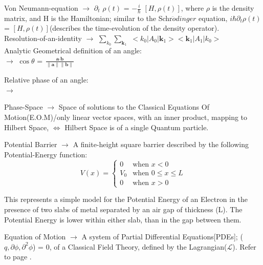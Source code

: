 \documentclass[a4paper, 10pt, onepage]{elegantbook}
\begin{document}
{Von Neumann-equation $\longrightarrow$ $\partial_t$ $\rho(t)$ = $- {\frac{i}{\hbar}}$ $[H,\rho(t)]$, where $\rho$ is the density matrix, and H is the Hamiltonian;
similar to the Schr$\ddot{o}dinger$ equation, $i\hbar \partial_t \rho(t)$ = $[H, \rho(t)]$(describes the time-evolution of the density operator).  \\
  
Resolution-of-an-identity $\longrightarrow$ $\sum_{k_0} \sum_{\mathbf k_1}$ $<k_0|A_0| {\mathbf k_1}><{\mathbf k_1}|A_1|k_0>$ \\

Analytic Geometrical definition of an angle:  \\

$\longrightarrow$ $\cos \theta$ = $\frac{\textbf{a} \cdot \textbf{b}}{\lVert \textbf{a} \rVert \lVert \textbf{b} \rVert}$

Relative phase of an angle:\\

$\longrightarrow$

Phase-Space $\longrightarrow$ Space of solutions to the Classical Equations Of Motion(E.O.M)/only linear vector spaces, with an inner product, mapping to Hilbert Space, $\iff$ Hilbert Space is of a single Quantum particle.

Potential Barrier $\longrightarrow$ A finite-height square barrier described by the following Potential-Energy function:  \\

\[
V(x) = \begin{cases}
0 & \text{when } x < 0 \\
V_0 & \text{when } 0 \leq x \leq L \\
0 & \text{when } x > 0
\end{cases}
\]

This represents a simple model for the Potential Energy of an Electron in the presence of two slabs of metal separated by an air gap of thickness (L). The Potential Energy is lower within either slab, than in the gap between them.

Equation of Motion $\longrightarrow$ A system of Partial Differential Equations[PDEs]; ($q, \partial \phi, \partial^2 \phi$) = $0$, of a Classical Field Theory, defined by the Lagrangian($\mathcal{L}$). Refer to page \pageref{sec:Lagrangian Formalism and Stationary Action}.\\

}
\end{document}
